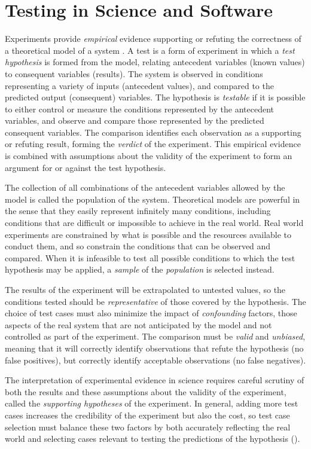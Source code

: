 \documentclass[11pt]{report}
\begin{document}
\section{Testing in Science and Software}
Experiments provide \emph{empirical} evidence
supporting or refuting the correctness of a theoretical model of a system \cite{Holt1982} .
A test is a form of experiment in which 
a \emph{test hypothesis} is formed from the model,
relating antecedent variables (known values) to 
consequent variables (results).
The system is observed in conditions representing
a variety of inputs (antecedent values),
and compared to the predicted output (consequent) variables.
The hypothesis is \emph{testable} if it is possible to 
either control or measure the conditions represented by the antecedent variables,
and observe and compare those represented by the predicted consequent variables.
The comparison identifies each observation as a supporting or refuting result,
forming the \emph{verdict} of the experiment.
This empirical evidence is combined with 
assumptions about the validity of the experiment
to form an argument for or against the test hypothesis.

The collection of all combinations of the antecedent variables
allowed by the model is called the population of the system.
Theoretical models are powerful in the sense that
they easily represent infinitely many conditions, 
including conditions that are difficult or impossible to achieve in the real world.
Real world experiments are constrained by 
what is possible and the resources available to conduct them,
and so constrain the conditions that can be observed and compared.
When it is infeasible to test 
all possible conditions to which the test hypothesis may be applied,
a \emph{sample} of the \emph{population} is selected instead.

The results of the experiment will be extrapolated to untested values,
so the conditions tested should be \emph{representative} of those covered by the hypothesis.
The choice of test cases must also minimize the impact of \emph{confounding} factors,
those aspects of the real system that are 
not anticipated by the model and not controlled as part of the experiment.
The comparison must be \emph{valid} and \emph{unbiased},
meaning that it will correctly identify 
observations that refute the hypothesis (no false positives),
but correctly identify acceptable observations (no false negatives).

The interpretation of experimental evidence in science
requires careful scrutiny of both the results and 
these assumptions about the validity of the experiment,
called the \emph{supporting hypotheses} of the experiment.
In general, adding more test cases 
increases the credibility of the experiment but also the cost,
so test case selection must balance these two factors
by both accurately reflecting the real world
and selecting cases relevant to testing the predictions of the hypothesis (\cite{Holt1982}).
\end{document}
